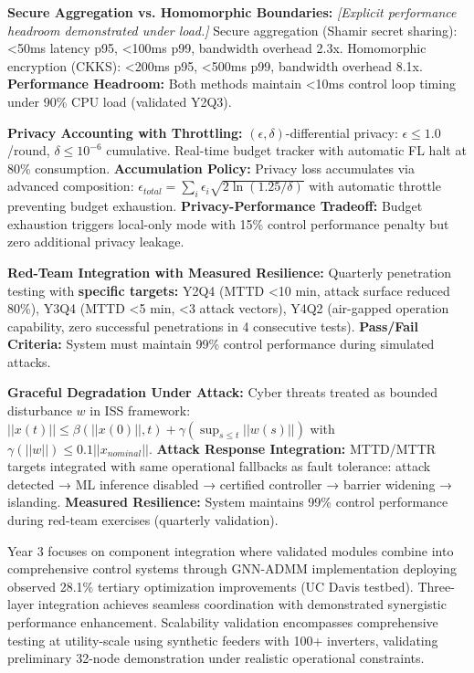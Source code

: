 \documentclass[12pt]{article}
\begin{document}
\textbf{Secure Aggregation vs. Homomorphic Boundaries:} \textit{[Explicit performance headroom demonstrated under load.]} Secure aggregation (Shamir secret sharing): <50ms latency p95, <100ms p99, bandwidth overhead 2.3x. Homomorphic encryption (CKKS): <200ms p95, <500ms p99, bandwidth overhead 8.1x. \textbf{Performance Headroom:} Both methods maintain <10ms control loop timing under 90\% CPU load (validated Y2Q3).

\textbf{Privacy Accounting with Throttling:} $(\epsilon, \delta)$-differential privacy: $\epsilon \leq 1.0$/round, $\delta \leq 10^{-6}$ cumulative. Real-time budget tracker with automatic FL halt at 80\% consumption. \textbf{Accumulation Policy:} Privacy loss accumulates via advanced composition: $\epsilon_{total} = \sum_i \epsilon_i \sqrt{2\ln(1.25/\delta)}$ with automatic throttle preventing budget exhaustion. \textbf{Privacy-Performance Tradeoff:} Budget exhaustion triggers local-only mode with 15\% control performance penalty but zero additional privacy leakage.

\textbf{Red-Team Integration with Measured Resilience:} Quarterly penetration testing with \textbf{specific targets:} Y2Q4 (MTTD <10 min, attack surface reduced 80\%), Y3Q4 (MTTD <5 min, <3 attack vectors), Y4Q2 (air-gapped operation capability, zero successful penetrations in 4 consecutive tests). \textbf{Pass/Fail Criteria:} System must maintain 99\% control performance during simulated attacks.

\textbf{Graceful Degradation Under Attack:} Cyber threats treated as bounded disturbance $w$ in ISS framework: $||x(t)|| \leq \beta(||x(0)||, t) + \gamma(\sup_{s \leq t} ||w(s)||)$ with $\gamma(||w||) \leq 0.1||x_{nominal}||$. \textbf{Attack Response Integration:} MTTD/MTTR targets integrated with same operational fallbacks as fault tolerance: attack detected → ML inference disabled → certified controller → barrier widening → islanding. \textbf{Measured Resilience:} System maintains 99\% control performance during red-team exercises (quarterly validation).

Year 3 focuses on component integration where validated modules combine into comprehensive control systems through GNN-ADMM implementation deploying observed 28.1\% tertiary optimization improvements (UC Davis testbed). Three-layer integration achieves seamless coordination with demonstrated synergistic performance enhancement. Scalability validation encompasses comprehensive testing at utility-scale using synthetic feeders with 100+ inverters, validating preliminary 32-node demonstration under realistic operational constraints.
\end{document}

